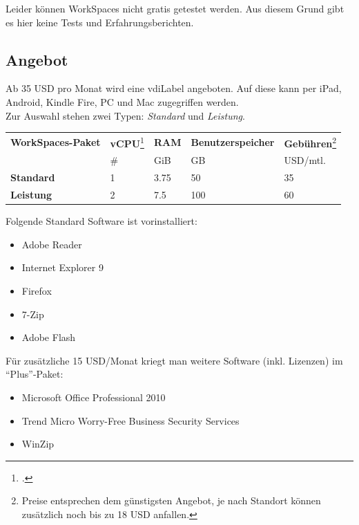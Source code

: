 Leider können WorkSpaces nicht gratis getestet werden. Aus diesem Grund gibt es hier keine Tests und Erfahrungsberichten.

\subsection{Angebot}
Ab 35 USD pro Monat wird eine \Gls{vdiLabel} angeboten. Auf diese kann per iPad, Android, Kindle Fire, PC und Mac zugegriffen werden.\\
Zur Auswahl stehen zwei Typen: \textit{Standard} und \textit{Leistung}.

\begin{table}[H]
	\centering
	\small\renewcommand{\arraystretch}{1.4}  
	\begin{tabularx}{0.9\textwidth}{X | Y | Y | Y | Y }
		\hline
		\textbf{WorkSpaces-Paket} & \textbf{vCPU}\footcite{Virtual_CPUs_with_Amazon_Web_Services_2014-11-15} & \textbf{RAM} & \textbf{Benutzerspeicher} & \textbf{Gebühren}\footnote{Preise entsprechen dem günstigsten Angebot, je nach Standort können zusätzlich noch bis zu 18 USD anfallen.}\\
		 & \# & GiB & GB & USD/mtl.\\
		\hline
			\textbf{Standard} & 1 & 3.75 & 50 & 35\\
			\textbf{Leistung} & 2 & 7.5 & 100 & 60\\
		\hline
	\end{tabularx}
\end{table}

Folgende Standard Software ist vorinstalliert:
\begin{itemize}
	\item Adobe Reader
	\item Internet Explorer 9
	\item Firefox
	\item 7-Zip
	\item Adobe Flash
\end{itemize}

Für zusätzliche 15 USD/Monat kriegt man weitere Software (inkl. Lizenzen) im "`Plus"'-Paket:
\begin{itemize}
	\item Microsoft Office Professional 2010
	\item Trend Micro Worry-Free Business Security Services
	\item WinZip
\end{itemize}

